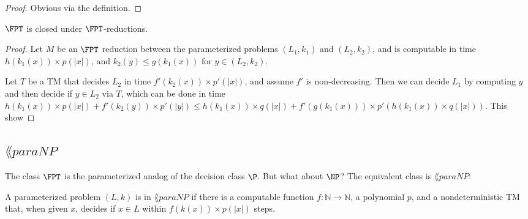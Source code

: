 \begin{proof}
Obvious via the definition.
\end{proof}

\begin{theorem}
$\FPT$ is closed under $\FPT$-reductions.
\end{theorem}

\begin{proof}
Let $M$ be an $\FPT$ reduction between the parameterized problems $(L_1, k_1)$ and $(L_2, k_2)$, and is computable in time $h(k_1(x)) \times p(|x|)$, and $k_2(y) \le g(k_1(x))$ for $y \in (L_2, k_2)$. 

\par Let $T$ be a TM that decides $L_2$ in time $f'(k_2(x)) \times p'(|x|)$, and assume $f'$ is non-decreasing. Then we can decide $L_1$ by computing $y$ and then decide if $y \in L_2$ via $T$, which can be done in time $h(k_1(x)) \times p(|x|) + f'(k_2(y)) \times p'(|y|) \le h(k_1(x)) \times q(|x|) + f'(g(k_1(x))) \times p'(h(k_1(x)) \times q(|x|))$. This show
\end{proof}

\newcommand{\paraNP}{\lang{paraNP}}
\subsection{$\paraNP$}
The class $\FPT$ is the parameterized analog of the decision class $\P$. But what about $\NP$? The equivalent class is $\paraNP$:
\begin{definition}
A parameterized problem $(L, k)$ is in $\paraNP$ if there is a computable function $f: \mathbb{N} \rightarrow \mathbb{N}$, a polynomial $p$, and a nondeterministic TM that, when given $x$, decides if $x \in L$ within $f(k(x)) \times p(|x|)$ steps.
\end{definition}

